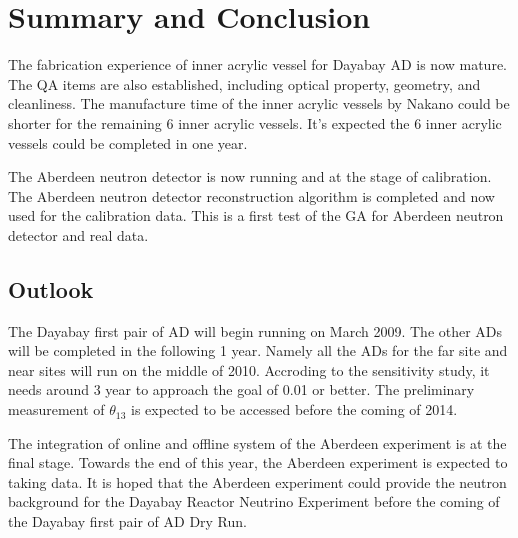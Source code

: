 \chapter {Summary and Conclusion}

The fabrication experience of inner acrylic vessel for Dayabay AD
is now mature.
The QA items are also established, including optical property, geometry, and
cleanliness.
The manufacture time of the inner acrylic vessels by Nakano
could be shorter for the remaining 6 inner acrylic vessels.
It's expected the 6 inner acrylic vessels could be completed in one year.

The Aberdeen neutron detector is now running and at the stage of calibration.
The Aberdeen neutron detector reconstruction algorithm is completed and
now used for the calibration data.
This is a first test of the GA for Aberdeen neutron detector and real data.


\section {Outlook}

The Dayabay first pair of AD will begin running on March 2009.
The other ADs will be completed in the following 1 year.
Namely all the ADs for the far site and near sites
will run on the middle of 2010.
Accroding to the sensitivity study,
it needs around 3 year to approach the goal of 0.01 or better.
The preliminary measurement of $\theta_{13}$ is expected
to be accessed before the coming of 2014.


The integration of online and offline system of the Aberdeen experiment is at the final stage.
Towards the end of this year, the Aberdeen experiment is expected to taking data.
It is hoped that the Aberdeen experiment could provide the neutron background for
the Dayabay Reactor Neutrino Experiment before the coming of the Dayabay first pair of
AD Dry Run.


